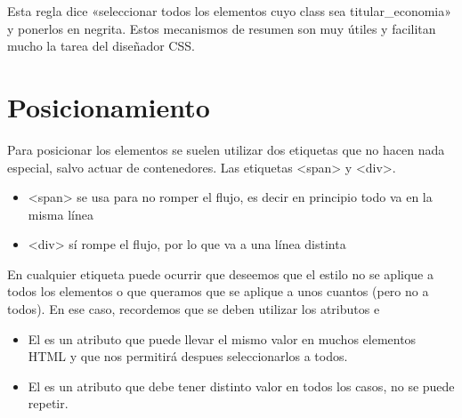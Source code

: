 \documentclass[letterpaper,10pt,spanish]{sphinxmanual}
\begin{document}
Esta regla dice «seleccionar todos los elementos cuyo class sea titular\_economia»  y ponerlos en negrita. Estos mecanismos de resumen son muy útiles y facilitan mucho la tarea del diseñador CSS.


\section{Posicionamiento}
\label{\detokenize{tema3:posicionamiento}}
Para posicionar los elementos se suelen utilizar dos etiquetas que no hacen nada especial, salvo actuar de contenedores. Las etiquetas \textless{}span\textgreater{} y \textless{}div\textgreater{}.
\begin{itemize}
\item {} 
\textless{}span\textgreater{} se usa para no romper el flujo, es decir en principio todo va en la misma línea

\item {} 
\textless{}div\textgreater{} sí rompe el flujo, por lo que va a una línea distinta

\end{itemize}

En cualquier etiqueta puede ocurrir que deseemos que el estilo no se aplique a todos los elementos o que queramos que se aplique a unos cuantos (pero no a todos). En ese caso, recordemos que se deben utilizar los atributos  e 
\begin{itemize}
\item {} 
El  es un atributo que puede llevar el mismo valor en muchos elementos HTML y que nos permitirá despues seleccionarlos a todos.

\item {} 
El  es un atributo que debe tener distinto valor en todos los casos, no se puede repetir.

\end{itemize}
\end{document}
